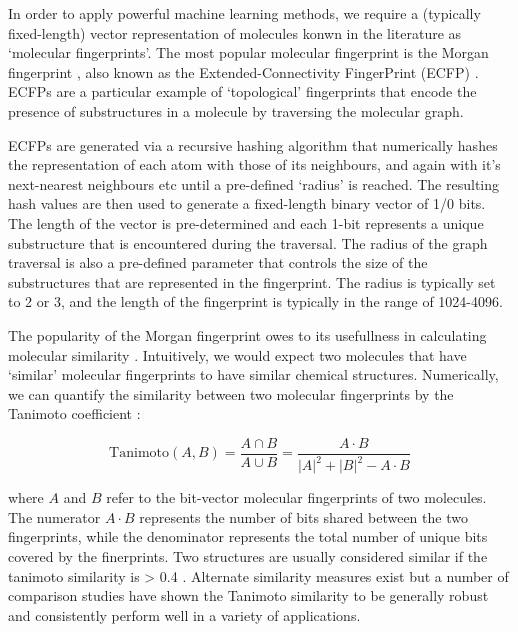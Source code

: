 In order to apply powerful machine learning methods, we require a (typically fixed-length) vector representation of molecules konwn in the literature as `molecular fingerprints'. The most popular molecular fingerprint is the Morgan fingerprint \cite{morgan1965fingerprints}, also known as the Extended-Connectivity FingerPrint (ECFP) \cite{rogers2010extended}. ECFPs are a particular example of `topological' fingerprints that encode the presence of substructures in a molecule by traversing the molecular graph.

ECFPs are generated via a recursive hashing algorithm that numerically hashes the representation of each atom with those of its neighbours, and again with it's next-nearest neighbours etc until a pre-defined `radius' is reached. The resulting hash values are then used to generate a fixed-length binary vector of 1/0 bits. The length of the vector is pre-determined and each 1-bit represents a unique substructure that is encountered during the traversal. The radius of the graph traversal is also a pre-defined parameter that controls the size of the substructures that are represented in the fingerprint. The radius is typically set to 2 or 3, and the length of the fingerprint is typically in the range of 1024-4096.

The popularity of the Morgan fingerprint owes to its usefullness in calculating molecular similarity \cite{Maggiora2014similarity}. Intuitively, we would expect two molecules that have `similar' molecular fingerprints to have similar chemical structures. Numerically, we can quantify the similarity between two molecular fingerprints by the Tanimoto coefficient \cite{Willet1998similarity}:

\begin{equation} \label{eqn:tanimoto}
    \mathrm{Tanimoto}(A, B) = \frac{A \cap B}{A \cup B} = \frac{A \cdot B}{|A|^{2} + |B|^{2} - A \cdot B}
\end{equation}

where $A$ and $B$ refer to the bit-vector molecular fingerprints of two molecules. The numerator $A \cdot B$ represents the number of bits shared between the two fingerprints, while the denominator represents the total number of unique bits covered by the finerprints. Two structures are usually considered similar if the tanimoto similarity is > 0.4 \cite{baldi2010similarity}. Alternate similarity measures exist but a number of comparison studies \cite{Todeschini2012tanimoto, Bajusz2015Tanimoto} have shown the Tanimoto similarity to be generally robust and consistently perform well in a variety of applications.

